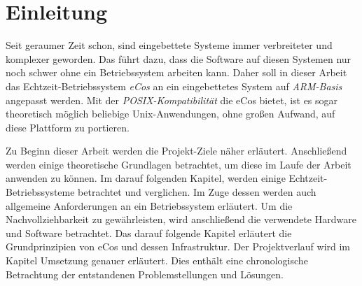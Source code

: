 \documentclass[
  a4paper,					%
  twoside,
  DIV=calc,     				%
  bibliography=totoc,
  cleardoublepage=empty,
  ngerman,     					%
  final       					%
]{scrbook}
\begin{document}









\mainmatter
\chapter{Einleitung}
\label{sec:Einleitung}
Seit geraumer Zeit schon, sind eingebettete Systeme immer verbreiteter und komplexer geworden. Das führt dazu, dass die Software auf diesen Systemen nur noch schwer ohne ein Betriebssystem arbeiten kann. Daher soll in dieser Arbeit das Echtzeit-Betriebssystem \emph{eCos} an ein eingebettetes System auf \emph{ARM-Basis} angepasst werden. Mit der \emph{POSIX-Kompatibilität} die eCos bietet, ist es sogar theoretisch möglich beliebige Unix-Anwendungen, ohne großen Aufwand, auf diese Plattform zu portieren.

Zu Beginn dieser Arbeit werden die Projekt-Ziele näher erläutert. Anschließend werden einige theoretische Grundlagen betrachtet, um diese im Laufe der Arbeit anwenden zu können. Im darauf folgenden Kapitel, werden einige Echtzeit-Betriebssysteme betrachtet und verglichen. Im Zuge dessen werden auch allgemeine Anforderungen an ein Betriebssystem erläutert. Um die Nachvollziehbarkeit zu gewährleisten, wird anschließend die verwendete Hardware und Software betrachtet. Das darauf folgende Kapitel erläutert die Grundprinzipien von eCos und dessen Infrastruktur. Der Projektverlauf wird im Kapitel Umsetzung genauer erläutert. Dies enthält eine chronologische Betrachtung der entstandenen Problemstellungen und Lösungen.







\end{document}
